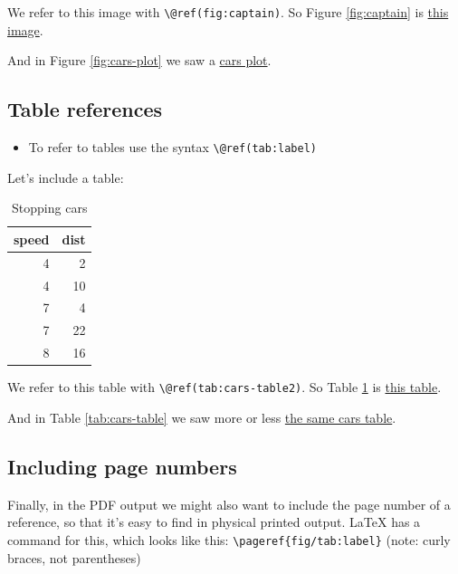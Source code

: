 \documentclass[a4paper, nobind]{templates/ociamthesis}
\providecommand{\tightlist}{%
  \setlength{\itemsep}{0pt}\setlength{\parskip}{0pt}}
\begin{document}
We refer to this image with \texttt{\textbackslash{}@ref(fig:captain)}.
So Figure \ref{fig:captain} is \protect\hyperlink{fig:captain}{this image}.

And in Figure \ref{fig:cars-plot} we saw a \protect\hyperlink{fig:cars-plot}{cars plot}.

\hypertarget{table-references}{%
\subsection{Table references}\label{table-references}}

\begin{itemize}
\tightlist
\item
  To refer to tables use the syntax \texttt{\textbackslash{}@ref(tab:label)}
\end{itemize}

Let's include a table:

\begin{table}

\caption{\label{tab:cars-table2}Stopping cars}
\centering
\begin{tabular}[t]{r|r}
\hline
speed & dist\\
\hline
4 & 2\\
\hline
4 & 10\\
\hline
7 & 4\\
\hline
7 & 22\\
\hline
8 & 16\\
\hline
\end{tabular}
\end{table}

We refer to this table with \texttt{\textbackslash{}@ref(tab:cars-table2)}.
So Table \ref{tab:cars-table2} is \protect\hyperlink{tab:cars-table2}{this table}.

And in Table \ref{tab:cars-table} we saw more or less \protect\hyperlink{tab:cars-table}{the same cars table}.

\hypertarget{including-page-numbers}{%
\subsection{Including page numbers}\label{including-page-numbers}}

Finally, in the PDF output we might also want to include the page number of a reference, so that it's easy to find in physical printed output.
LaTeX has a command for this, which looks like this: \texttt{\textbackslash{}pageref\{fig/tab:label\}} (note: curly braces, not parentheses)
\end{document}
